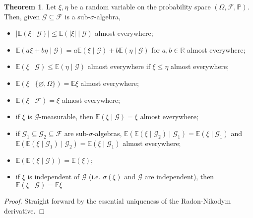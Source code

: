 \documentclass[]{article}
\theoremstyle{definition}
\newtheorem{theorem}{Theorem}
\theoremstyle{definition}
\begin{document}
\begin{theorem}
  Let \(\xi, \eta\) be a random variable on the probability space 
  \((\Omega, \mathcal{F}, \mathbb{P})\). Then, given \(\mathcal{G} \subseteq \mathcal{F}\) 
  is a sub-\(\sigma\)-algebra,
  \begin{itemize}
    \item \(|\mathbb{E}(\xi \mid \mathcal{G})| \le \mathbb{E}(|\xi| \mid \mathcal{G})\) 
      almost everywhere;
    \item \(\mathbb{E}(a \xi + b \eta \mid \mathcal{G}) = 
      a\mathbb{E}(\xi \mid \mathcal{G}) + b\mathbb{E}(\eta \mid \mathcal{G})\)
      for \(a, b \in \mathbb{R}\) almost everywhere;
    \item \(\mathbb{E}(\xi \mid \mathcal{G}) \le \mathbb{E}(\eta \mid \mathcal{G})\)
      almost everywhere if \(\xi \le \eta\) almost everywhere;
    \item \(\mathbb{E}(\xi \mid \{\varnothing, \Omega\}) = \mathbb{E}\xi\)
      almost everywhere;
    \item \(\mathbb{E}(\xi \mid \mathcal{F}) = \xi\) almost everywhere;
    \item if \(\xi\) is \(\mathcal{G}\)-measurable, then 
      \(\mathbb{E}(\xi \mid \mathcal{G}) = \xi\) almost everywhere;
    \item if \(\mathcal{G_1} \subseteq \mathcal{G}_2 \subseteq \mathcal{F}\) are 
      sub-\(\sigma\)-algebras, \(\mathbb{E}(\mathbb{E}(\xi \mid \mathcal{G}_2) \mid \mathcal{G}_1) 
      = \mathbb{E}(\xi \mid \mathcal{G}_1)\) and 
      \(\mathbb{E}(\mathbb{E}(\xi \mid \mathcal{G}_1) \mid \mathcal{G}_2) 
      = \mathbb{E}(\xi \mid \mathcal{G}_1)\) almost everywhere;
    \item \(\mathbb{E}(\mathbb{E}(\xi \mid \mathcal{G})) = \mathbb{E}(\xi)\);
    \item if \(\xi\) is independent of \(\mathcal{G}\) (i.e. \(\sigma(\xi)\) and 
      \(\mathcal{G}\) are independent), then 
      \(\mathbb{E}(\xi \mid \mathcal{G}) = \mathbb{E} \xi\)
  \end{itemize}
\end{theorem}
\begin{proof}
  Straight forward by the essential uniqueness of the Radon-Nikodym derivative.
\end{proof}
\end{document}
